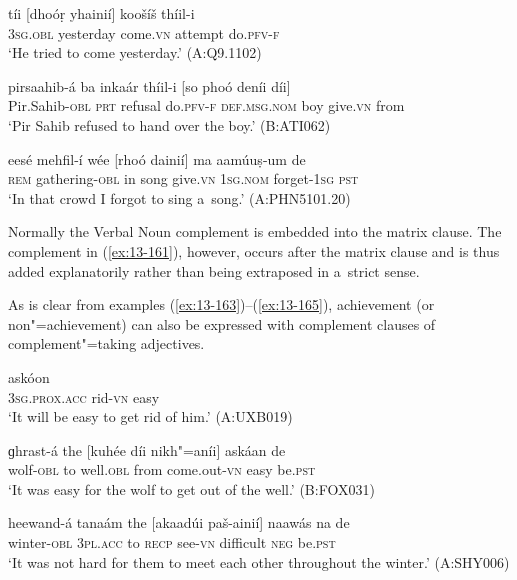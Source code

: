 \begin{exe}
\ex
\label{ex:13-160}
\gll tíi [dhoóṛ yhainií] koošíš thíil-i \\
\textsc{3sg.obl} yesterday come.\textsc{vn} attempt do.\textsc{pfv-f} \\
\glt `He tried to come yesterday.' (A:Q9.1102)

\ex
\label{ex:13-161}
\gll pirsaahib-á ba inkaár thíil-i [so phoó  deníi díi] \\
Pir.Sahib-\textsc{obl} \textsc{prt} refusal do.\textsc{pfv-f} \textsc{def.msg.nom} boy  give.\textsc{vn} from \\
\glt `Pir Sahib refused to hand over the boy.' (B:ATI062)

\ex
\label{ex:13-162}
\gll eesé mehfil-í wée [rhoó dainií] ma  aamúuṣ-um de \\
\textsc{rem} gathering-\textsc{obl} in song give.\textsc{vn} \textsc{1sg.nom} forget-\textsc{1sg} \textsc{pst} \\
\glt `In that crowd I forgot to sing a~song.' (A:PHN5101.20) 
\end{exe}

Normally the Verbal Noun complement is embedded into the matrix clause. The complement in (\ref{ex:13-161}), however, occurs after the matrix clause and is thus added explanatorily rather than being extraposed in a~strict sense.


As is clear from examples (\ref{ex:13-163})--(\ref{ex:13-165}), achievement (or non"=achievement) can also be expressed with complement clauses of complement"=taking adjectives.

\begin{exe}
\ex
\label{ex:13-163}
\gll [nis phus"=ainií] askóon \\
\textsc{3sg.prox.acc} rid-\textsc{vn} easy \\
\glt `It will be easy to get rid of him.' (A:UXB019)

\ex
\label{ex:13-164}
\gll ɡhrast-á the [kuhée díi nikh"=aníi] askáan de  \\
wolf-\textsc{obl} to well.\textsc{obl} from come.out-\textsc{vn} easy be.\textsc{pst}  \\
\glt `It was easy for the wolf to get out of the well.' (B:FOX031)

\ex
\label{ex:13-165}
\gll heewand-á tanaám the [akaadúi paš-ainií] naawás  na de \\
winter-\textsc{obl} \textsc{3pl.acc} to \textsc{recp} see-\textsc{vn} difficult \textsc{neg} be.\textsc{pst} \\
\glt `It was not hard for them to meet each other throughout the winter.' (A:SHY006) 
\end{exe}

